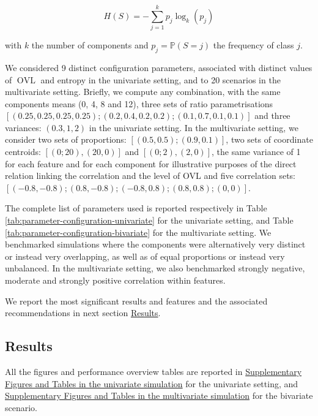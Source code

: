 \begin{equation}
    H(S)=-\sum_{j=1}^k p_j \log_k (p_j)
\label{eq:entropy}
\end{equation}

with \(k\) the number of components and \(p_j=\mathbb{P}(S=j)\) the
frequency of class \(j\).

We considered 9 distinct configuration parameters, associated with distinct values of \(\operatorname{OVL}\) and entropy in the univariate setting, and to 20 scenarios in the multivariate setting. Briefly, we compute any combination, with the same components means (0, 4, 8 and 12), three sets of ratio parametrisations \(\left[(0.25, 0.25, 0.25, 0.25); (0.2, 0.4, 0.2, 0.2); (0.1, 0.7, 0.1, 0.1) \right]\) and three variances: \((0.3, 1, 2)\) in the univariate setting. In the multivariate setting, we consider two sets of proportions: \(\left[(0.5, 0.5); (0.9, 0.1) \right]\), two sets of coordinate centroids: \(\left[(0; 20), (20, 0) \right]\) and \(\left[(0; 2), (2, 0) \right]\), the same variance of 1 for each feature and for each component for illustrative purposes of the direct relation linking the correlation and the level of OVL and five correlation sets: \(\left[(-0.8, -0.8); (0.8, -0.8); (-0.8, 0.8); (0.8, 0.8); (0, 0)\right]\).

The complete list of parameters used is reported respectively in Table \ref{tab:parameter-configuration-univariate} for the univariate setting, and Table \ref{tab:parameter-configuration-bivariate} for the multivariate setting. We benchmarked simulations where the components were alternatively very distinct or instead very overlapping, as well as of equal proportions or instead very unbalanced. In the multivariate setting, we also benchmarked strongly negative, moderate and strongly positive correlation within features.

We report the most significant results and features and the associated recommendations in next section \protect\hyperlink{results}{Results}.

\hypertarget{results}{%
\subsection{Results}\label{results}}

All the figures and performance overview tables are reported in \protect\hyperlink{supplementary-figures-and-tables-in-the-univariate-simulation}{Supplementary Figures and Tables in the univariate simulation} for the univariate setting, and \protect\hyperlink{supplementary-figures-and-tables-in-the-multivariate-simulation}{Supplementary Figures and Tables in the multivariate simulation} for the bivariate scenario.

